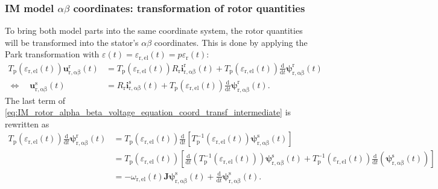 \begin{frame}
	\frametitle{IM model $\alpha\beta$ coordinates: transformation of rotor quantities}
    To bring both model parts into the same coordinate system, the rotor quantities will be transformed into the stator's $\alpha\beta$ coordinates. This is done by applying the Park transformation with $\varepsilon(t) = \varepsilon_\mathrm{r,el}(t)=p\varepsilon_\mathrm{r}(t)$: 
    \begin{equation}
        \begin{split}
        T_\mathrm{p}(\varepsilon_\mathrm{r,el}(t))\bm{u}^\mathrm{r}_\mathrm{r,\alpha\beta}(t) &= T_\mathrm{p}(\varepsilon_\mathrm{r,el}(t))R_\mathrm{r} \bm{i}^\mathrm{r}_\mathrm{r,\alpha\beta}(t)+ T_\mathrm{p}(\varepsilon_\mathrm{r,el}(t))\frac{\mathrm{d}}{\mathrm{d}t}\bm{\psi}^\mathrm{r}_\mathrm{r,\alpha\beta}(t)\\
        \Leftrightarrow\quad  \bm{u}^\mathrm{s}_\mathrm{r,\alpha\beta}(t)   &= R_\mathrm{r} \bm{i}^\mathrm{s}_\mathrm{r,\alpha\beta}(t)+ T_\mathrm{p}(\varepsilon_\mathrm{r,el}(t))\frac{\mathrm{d}}{\mathrm{d}t}\bm{\psi}^\mathrm{r}_\mathrm{r,\alpha\beta}(t).
        \label{eq:IM_rotor_alpha_beta_voltage_equation_coord_transf_intermediate}
    \end{split}
    \end{equation}
    The last term of \eqref{eq:IM_rotor_alpha_beta_voltage_equation_coord_transf_intermediate} is rewritten as
    \begin{align*}
        T_\mathrm{p}(\varepsilon_\mathrm{r,el}(t))\frac{\mathrm{d}}{\mathrm{d}t}\bm{\psi}^\mathrm{r}_\mathrm{r,\alpha\beta}(t) &= T_\mathrm{p}(\varepsilon_\mathrm{r,el}(t))\frac{\mathrm{d}}{\mathrm{d}t}\left[T_\mathrm{p}^{-1}(\varepsilon_\mathrm{r,el}(t))\bm{\psi}^\mathrm{s}_\mathrm{r,\alpha\beta}(t)\right] \\ &=  T_\mathrm{p}(\varepsilon_\mathrm{r,el}(t))\left[\frac{\mathrm{d}}{\mathrm{d}t}\left(T_\mathrm{p}^{-1}(\varepsilon_\mathrm{r,el}(t))\right)\bm{\psi}^\mathrm{s}_\mathrm{r,\alpha\beta}(t) + T_\mathrm{p}^{-1}(\varepsilon_\mathrm{r,el}(t)) \frac{\mathrm{d}}{\mathrm{d}t}\left(\bm{\psi}^\mathrm{s}_\mathrm{r,\alpha\beta}(t)\right)\right]
        \\ &= -\omega_\mathrm{r,el}(t)\bm{J}\bm{\psi}^\mathrm{s}_\mathrm{r,\alpha\beta}(t) +\frac{\mathrm{d}}{\mathrm{d}t}\bm{\psi}^\mathrm{s}_\mathrm{r,\alpha\beta}(t).
    \end{align*}
\end{frame}

